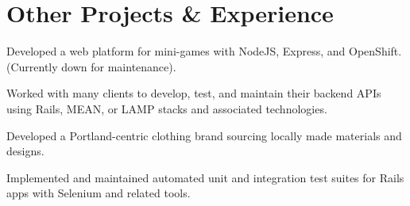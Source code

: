 \documentclass[]{jhearn-resume}
\begin{document}
\begin{minipage}[t]{0.64\textwidth} 
\vspace{-11pt}
\noindent\makebox[\linewidth]{\rule{1000pt}{0.4pt}}
\vspace{-5pt}

\section{Other Projects \& Experience}

\begin{tightemize}
\item Developed a web platform for mini-games with NodeJS, Express, and OpenShift. (Currently down for maintenance).
\end{tightemize}
\sectionsep

\begin{tightemize}
\item Worked with many clients to develop, test, and maintain their backend APIs using Rails, MEAN, or LAMP stacks and associated technologies.
\end{tightemize}
\sectionsep

\begin{tightemize}
\item Developed a Portland-centric clothing brand sourcing locally made materials and designs.
\end{tightemize}
\sectionsep

\begin{tightemize}
\item Implemented and maintained automated unit and integration test suites for Rails apps with Selenium and related tools.
\end{tightemize}
\sectionsep


\end{minipage}
\end{document}
